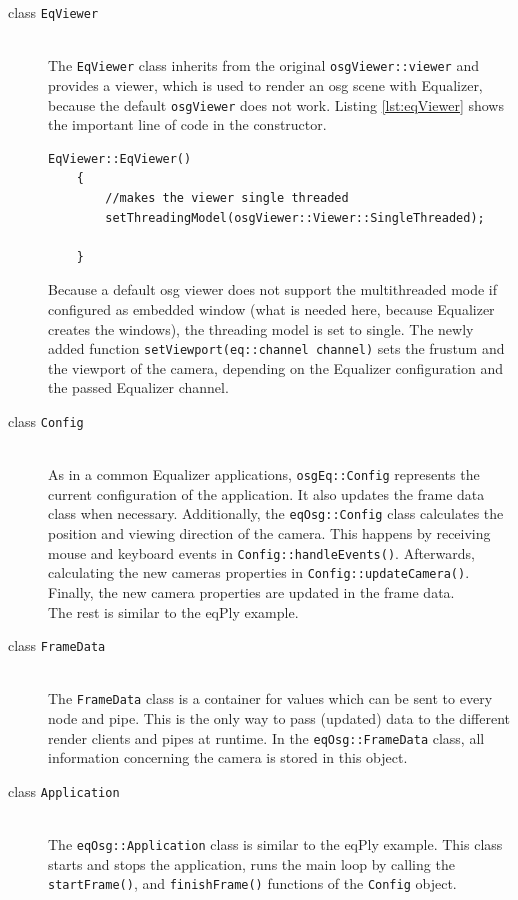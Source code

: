 \begin{description}
	\item [class \texttt{EqViewer}]\hfill\\
		The \texttt{EqViewer} class inherits from the original \texttt{osgViewer::viewer} and provides a viewer, which is used to render an \gls{osg} scene with Equalizer, because the default \texttt{osgViewer} does not work. Listing \ref{lst:eqViewer} shows the important line of code in the constructor.

	\begin{lstlisting}[caption={Constructor of the \texttt{EqViewer}},label={lst:eqViewer}]
	EqViewer::EqViewer()
	{
		//makes the viewer single threaded
		setThreadingModel(osgViewer::Viewer::SingleThreaded);

	}
	\end{lstlisting}
	Because a default \gls{osg} viewer does not support the multithreaded mode if configured as embedded window (what is needed here, because Equalizer creates the windows), the threading model is set to single. The newly added function \texttt{setViewport(eq::channel channel)} sets the frustum and the viewport of the camera, depending on the Equalizer configuration and the passed Equalizer channel.
	\item[class \texttt{Config}]\hfill\\
		As in a common Equalizer applications, \texttt{osgEq::Config} represents the current configuration of the application. It also updates the frame data class when necessary. Additionally, the \texttt{eqOsg::Config} class calculates the position and viewing direction of the camera. This happens by receiving mouse and keyboard events in \texttt{Config::handleEvents()}. Afterwards, calculating the new cameras properties in \texttt{Config::updateCamera()}. Finally, the new camera properties are updated in the frame data. \\ The rest is similar to the eqPly example.
	\item[class \texttt{FrameData}]\hfill\\
		The \texttt{FrameData} class is a container for values which can be sent to every node and pipe. This is the only way to pass (updated) data to the different render clients and pipes at runtime. In the \texttt{eqOsg::FrameData} class, all information concerning the camera is stored in this object.
	\item[class \texttt{Application}]\hfill\\
		The \texttt{eqOsg::Application} class is similar to the eqPly example. This class starts and stops the application, runs the main loop by calling the \texttt{startFrame()}, and \texttt{finishFrame()} functions of the \texttt{Config} object.

\end{description}
